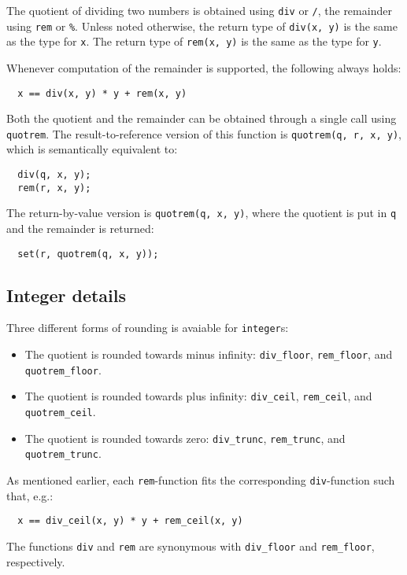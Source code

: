 \documentclass[a4paper]{article}
\begin{document}
The quotient of dividing two numbers is obtained using \texttt{div} or \texttt{/}, the remainder using \texttt{rem} or \texttt{\%}. Unless noted otherwise, the return type of \texttt{div(x, y)} is the same as the type for \texttt{x}. The return type of \texttt{rem(x, y)} is the same as the type for \texttt{y}.

Whenever computation of the remainder is supported, the following always holds:
\begin{verbatim}
  x == div(x, y) * y + rem(x, y)
\end{verbatim}

Both the quotient and the remainder can be obtained through a single call using \texttt{quotrem}. The result-to-reference version of this function is \texttt{quotrem(q, r, x, y)}, which is semantically equivalent to:
\begin{verbatim}
  div(q, x, y);
  rem(r, x, y);
\end{verbatim}

The return-by-value version is \texttt{quotrem(q, x, y)}, where the quotient is put in \texttt{q} and the remainder is returned:
\begin{verbatim}
  set(r, quotrem(q, x, y));
\end{verbatim}

\subsection{Integer details}

Three different forms of rounding is avaiable for \texttt{integer}s:
\begin{itemize}
\item The quotient is rounded towards minus infinity: \texttt{div\_floor}, \texttt{rem\_floor}, and \texttt{quotrem\_floor}.
\item The quotient is rounded towards plus infinity: \texttt{div\_ceil}, \texttt{rem\_ceil}, and \texttt{quotrem\_ceil}.
\item The quotient is rounded towards zero: \texttt{div\_trunc}, \texttt{rem\_trunc}, and \texttt{quotrem\_trunc}.
\end{itemize}
As mentioned earlier, each \texttt{rem}-function fits the corresponding \texttt{div}-function such that, e.g.:
\begin{verbatim}
  x == div_ceil(x, y) * y + rem_ceil(x, y)
\end{verbatim}

The functions \texttt{div} and \texttt{rem} are synonymous with \texttt{div\_floor} and \texttt{rem\_floor}, respectively.
\end{document}

